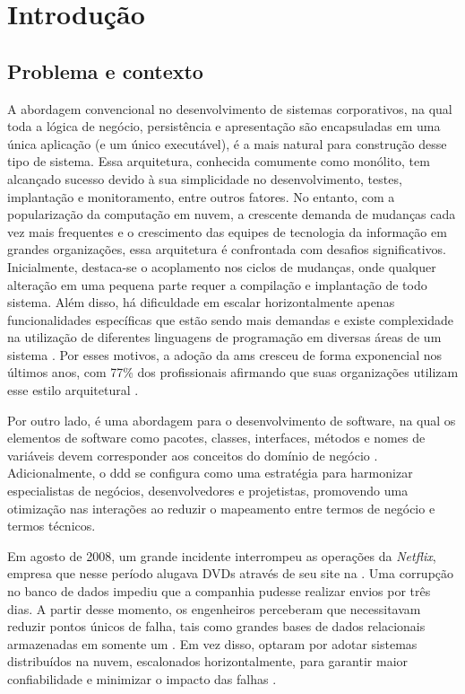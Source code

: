 \chapter{Introdução}
\label{cap:introducao}

\section{Problema e contexto}

A abordagem convencional no desenvolvimento de sistemas corporativos, na qual toda a lógica de negócio, persistência e apresentação são encapsuladas em uma única aplicação (e um único executável), é a mais natural para construção desse tipo de sistema. Essa arquitetura, conhecida comumente como monólito, tem alcançado sucesso devido à sua simplicidade no desenvolvimento, testes, implantação e monitoramento, entre outros fatores. No entanto, com a popularização da computação em nuvem, a crescente demanda de mudanças cada vez mais frequentes e o crescimento das equipes de tecnologia da informação em grandes organizações, essa arquitetura é confrontada com desafios significativos. Inicialmente, destaca-se o acoplamento nos ciclos de mudanças, onde qualquer alteração em uma pequena parte requer a compilação e implantação de todo sistema. Além disso, há dificuldade em escalar horizontalmente apenas funcionalidades específicas que estão sendo mais demandas e existe complexidade na utilização de diferentes linguagens de programação em diversas áreas de um sistema \cite{microservices}. Por esses motivos, a adoção da \acrlong{ams} cresceu de forma exponencial nos últimos anos, com 77\% dos profissionais afirmando que suas organizações utilizam esse estilo arquitetural \cite{microserviceAdoption}.

Por outro lado,  é uma abordagem para o desenvolvimento de software, na qual os elementos de software como pacotes, classes, interfaces, métodos e nomes de variáveis devem corresponder aos conceitos do domínio de negócio \cite{dddFowler}. Adicionalmente, o \acrshort{ddd} se configura como uma estratégia para harmonizar especialistas de negócios, desenvolvedores e projetistas, promovendo uma otimização nas interações ao reduzir o mapeamento entre termos de negócio e termos técnicos.

Em agosto de 2008, um grande incidente interrompeu as operações da \emph{Netflix}, empresa que nesse período alugava DVDs através de seu site na . Uma corrupção no banco de dados impediu que a companhia pudesse realizar envios por três dias. A partir desse momento, os engenheiros perceberam que necessitavam reduzir pontos únicos de falha, tais como grandes bases de dados relacionais armazenadas em somente um . Em vez disso, optaram por adotar sistemas distribuídos na nuvem, escalonados horizontalmente, para garantir maior confiabilidade e minimizar o impacto das falhas \cite{netflixMigration}.


